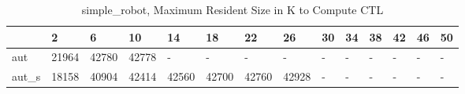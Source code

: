 \begin{table}
\caption{simple_robot, Maximum Resident Size in K to Compute CTL}
\label{simple_robot_CTL_size}
\begin{tabular}{llllllllllllll}
\toprule
 & 2 & 6 & 10 & 14 & 18 & 22 & 26 & 30 & 34 & 38 & 42 & 46 & 50 \\
\midrule
aut & 21964 & 42780 & 42778 & - & - & - & - & - & - & - & - & - & - \\
aut_s & 18158 & 40904 & 42414 & 42560 & 42700 & 42760 & 42928 & - & - & - & - & - & - \\
\bottomrule
\end{tabular}
\end{table}
